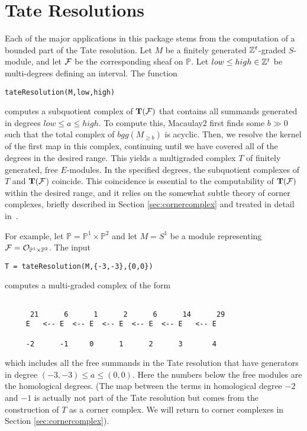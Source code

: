 \documentclass[twoside,12pt, leqno]{amsart}
\def\PP{{\mathbb P}}
\def\bT{{\bf T}}
\begin{document}


\section{Tate Resolutions}\label{sec:tate resolutions}
Each of the major applications in this package stems from the computation of a bounded part of the Tate resolution.
Let $M$ be a finitely generated ${\mathbb Z}^t$-graded $S$-module, and let ${\mathcal F}$ be the 
corresponding sheaf on $\PP$. Let
$low\leq high\in {\mathbb Z}^t$ be multi-degrees defining an interval.  The function
\begin{verbatim}
tateResolution(M,low,high)
\end{verbatim}
computes a subquotient complex of $\bT(\sF)$ that contains all summands generated in degrees $low\leq a \leq  high$.  To compute this, Macaulay2 first finds some $b\gg 0$ such that the total complex of $bgg(M_{\geq b})$ is acyclic.  	Then, we resolve the kernel of  the first map in this complex, continuing until we have covered all of the degrees in the desired range.  This yields a multigraded complex $T$ of finitely generated, free $E$-modules.  In the specified degrees, the subquotient complexes of $T$ and $\bT(\sF$) coincide.  This coincidence is essential to the computability of $\bT(\sF)$ within the desired range, and it relies on the somewhat subtle theory of corner complexes, briefly described in Section \ref{sec:cornercomplex} and treated in detail in~\cite{EES}.

For example, let $\PP=\PP^1\times \PP^2$ and let $M=S^1$ be a module representing $\sF=\cO_{\PP^1\times \PP^2}$.  The input
\begin{verbatim}
T = tateResolution(M,{-3,-3},{0,0})
\end{verbatim}
computes a multi-graded complex of the form
{\small \begin{verbatim}

      21      6      1      2      6      14      29
     E   <-- E  <-- E  <-- E  <-- E  <-- E   <-- E
                                                      
     -2      -1     0      1      2      3       4
\end{verbatim}}
\noindent which includes all the free summands in the Tate resolution that have generators in degree $(-3,-3)\leq a\leq (0,0)$. Here the numbers below the free modules are the homological degrees. (The map between the terms in homological degree $-2$ and $-1$ is actually not part of the Tate resolution but  comes from the construction of $T$ as a corner complex. We will return to corner complexes in Section \ref{sec:cornercomplex}). 
\end{document}
